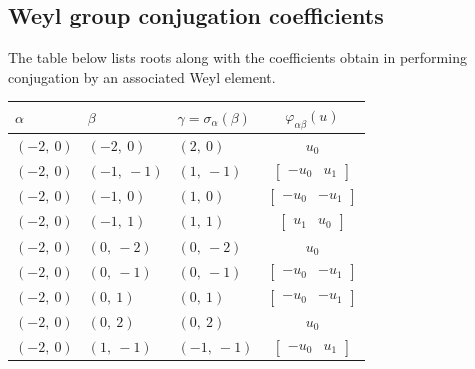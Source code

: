 \documentclass[11pt]{article}
\newcommand{\noi}{\noindent}
\theoremstyle{definition}
\begin{document}
\subsection{Weyl group conjugation coefficients}

The table below lists roots along with the coefficients obtain in performing conjugation by an associated Weyl element.

\bigskip

\noi \noindent \begin{longtable}{|l|l|l|c|}
    \hline
    \textbf{$\alpha$} & \textbf{$\beta$} & \textbf{$\gamma = \sigma_{\alpha}(\beta)$} & $\varphi_{\alpha\beta}(u)$ \\
    \hline
    \endhead
    $\left( -2, \  0\right)$ & $\left( -2, \  0\right)$ & $\left( 2, \  0\right)$ & $u_{0}$ \\
    \hline
    $\left( -2, \  0\right)$ & $\left( -1, \  -1\right)$ & $\left( 1, \  -1\right)$ & $\left[\begin{matrix}- u_{0} & u_{1}\end{matrix}\right]$ \\
    \hline
    $\left( -2, \  0\right)$ & $\left( -1, \  0\right)$ & $\left( 1, \  0\right)$ & $\left[\begin{matrix}- u_{0} & - u_{1}\end{matrix}\right]$ \\
    \hline
    $\left( -2, \  0\right)$ & $\left( -1, \  1\right)$ & $\left( 1, \  1\right)$ & $\left[\begin{matrix}u_{1} & u_{0}\end{matrix}\right]$ \\
    \hline
    $\left( -2, \  0\right)$ & $\left( 0, \  -2\right)$ & $\left( 0, \  -2\right)$ & $u_{0}$ \\
    \hline
    $\left( -2, \  0\right)$ & $\left( 0, \  -1\right)$ & $\left( 0, \  -1\right)$ & $\left[\begin{matrix}- u_{0} & - u_{1}\end{matrix}\right]$ \\
    \hline
    $\left( -2, \  0\right)$ & $\left( 0, \  1\right)$ & $\left( 0, \  1\right)$ & $\left[\begin{matrix}- u_{0} & - u_{1}\end{matrix}\right]$ \\
    \hline
    $\left( -2, \  0\right)$ & $\left( 0, \  2\right)$ & $\left( 0, \  2\right)$ & $u_{0}$ \\
    \hline
    $\left( -2, \  0\right)$ & $\left( 1, \  -1\right)$ & $\left( -1, \  -1\right)$ & $\left[\begin{matrix}- u_{0} & u_{1}\end{matrix}\right]$ \\

\end{longtable}
\end{document}
